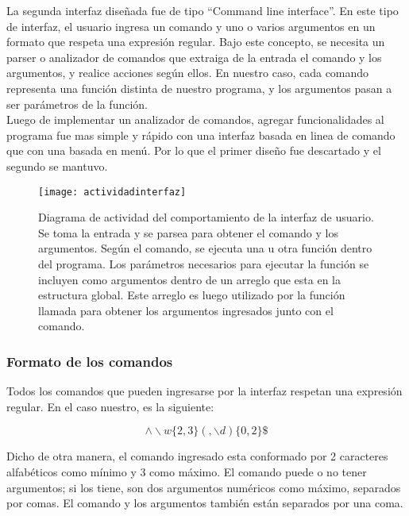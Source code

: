La segunda interfaz diseñada fue de tipo ``Command line interface''. En este tipo de interfaz, el usuario ingresa un comando y uno o varios argumentos en un formato que respeta una expresión regular. Bajo este concepto, se necesita un parser o analizador de comandos que extraiga de la entrada el comando y los argumentos, y realice acciones según ellos. En nuestro caso, cada comando representa una función distinta de nuestro programa, y los argumentos pasan a ser parámetros de la función. \\

Luego de implementar un analizador de comandos, agregar funcionalidades al programa fue mas simple y rápido con una interfaz basada en linea de comando que con una basada en menú. Por lo que el primer diseño fue descartado y el segundo se mantuvo. \\

\begin{figure}[h]
  \centering
  \texttt{[image: actividadinterfaz]}
  \caption[Diagrama de actividad del comportamiento de la interfaz de usuario]{Diagrama de actividad del comportamiento de la interfaz de usuario. Se toma la entrada y se parsea para obtener el comando y los argumentos. Según el comando, se ejecuta una u otra función dentro del programa. Los parámetros necesarios para ejecutar la función se incluyen como argumentos dentro de un arreglo que esta en la estructura global. Este arreglo es luego utilizado por la función llamada para obtener los argumentos ingresados junto con el comando.}\label{fig:actividadinterfaz}
\end{figure}

\subsubsection{Formato de los comandos} %
\label{it2:ssub:formato_de_los_comandos}

Todos los comandos que pueden ingresarse por la interfaz respetan una expresión regular. En el caso nuestro, es la siguiente:

\begin{equation}
\wedge \backslash w \{2,3\} (,\backslash d )\{0,2\} \$
\end{equation}

Dicho de otra manera, el comando ingresado esta conformado por 2 caracteres alfabéticos como mínimo y 3 como máximo. El comando puede o no tener argumentos; si los tiene, son dos argumentos numéricos como máximo, separados por comas. El comando y los argumentos también están separados por una coma.

